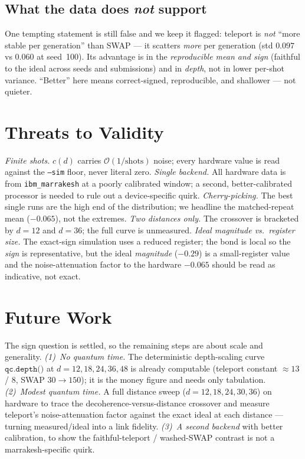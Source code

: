 \documentclass[conference]{IEEEtran}
\begin{document}
\subsection{What the data does \emph{not} support}

One tempting statement is still false and we keep it flagged: teleport is \emph{not}
``more stable per generation'' than SWAP --- it scatters \emph{more} per generation (std
$0.097$ vs $0.060$ at seed~100). Its advantage is in the \emph{reproducible mean and sign}
(faithful to the ideal across seeds and submissions) and in \emph{depth}, not in
lower per-shot variance. ``Better'' here means correct-signed, reproducible, and shallower
--- not quieter.

\section{Threats to Validity}

\emph{Finite shots.} $c(d)$ carries $\mathcal{O}(1/\text{shots})$ noise; every hardware
value is read against the \texttt{--sim} floor, never literal zero. \emph{Single backend.}
All hardware data is from \texttt{ibm\_marrakesh} at a poorly calibrated window; a
second, better-calibrated processor is needed to rule out a device-specific quirk.
\emph{Cherry-picking.} The best single runs are the high end of the distribution; we
headline the matched-repeat mean ($-0.065$), not the extremes. \emph{Two distances only.}
The crossover is bracketed by $d{=}12$ and $d{=}36$; the full curve is unmeasured.
\emph{Ideal magnitude vs.\ register size.} The exact-sign simulation uses a reduced
register; the bond is local so the \emph{sign} is representative, but the ideal
\emph{magnitude} ($-0.29$) is a small-register value and the noise-attenuation factor to
the hardware $-0.065$ should be read as indicative, not exact.

\section{Future Work}

The sign question is settled, so the remaining steps are about scale and generality.
\emph{(1)~No quantum time.} The deterministic depth-scaling curve $\texttt{qc.depth()}$ at
$d{=}12,18,24,36,48$ is already computable (teleport constant $\approx13$ / $8$, SWAP
$30{\to}150$); it is the money figure and needs only tabulation. \emph{(2)~Modest quantum
time.} A full distance sweep ($d{=}12,18,24,30,36$) on hardware to trace the
decoherence-versus-distance crossover and measure teleport's noise-attenuation factor
against the exact ideal at each distance --- turning measured/ideal into a link fidelity.
\emph{(3)~A second backend} with better calibration, to show the faithful-teleport /
washed-SWAP contrast is not a marrakesh-specific quirk.
\end{document}
